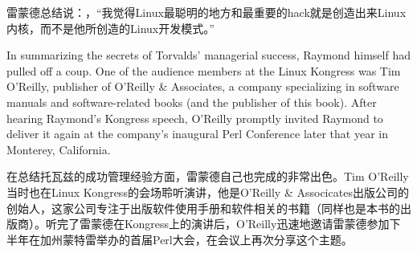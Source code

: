 \ifdefined\chs
雷蒙德总结说：，``我觉得Linux最聪明的地方和最重要的hack就是创造出来Linux内核，而不是他所创造的Linux开发模式。''
\fi




\ifdefined\eng
In summarizing the secrets of Torvalds' managerial success, Raymond himself had pulled off a coup. One of the audience members at the Linux Kongress was Tim O'Reilly, publisher of O'Reilly \& Associates, a company specializing in software manuals and software-related books (and the publisher of this book). After hearing Raymond's Kongress speech, O'Reilly promptly invited Raymond to deliver it again at the company's inaugural Perl Conference later that year in Monterey, California.
\fi

\ifdefined\chs
在总结托瓦兹的成功管理经验方面，雷蒙德自己也完成的非常出色。Tim O'Reilly当时也在Linux Kongress的会场聆听演讲，他是O'Reilly \& Associcates出版公司的创始人，这家公司专注于出版软件使用手册和软件相关的书籍（同样也是本书的出版商）。听完了雷蒙德在Kongress上的演讲后，O'Reilly迅速地邀请雷蒙德参加下半年在加州蒙特雷举办的首届Perl大会，在会议上再次分享这个主题。
\fi

